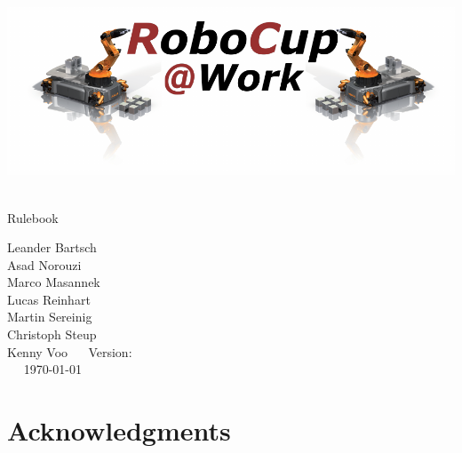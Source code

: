 
\begin{titlepage}
  \begin{center}
    {

      \includegraphics[width=\textwidth]{images/logo_RoboCupAtWork.pdf}\\[1.23ex]
    }
    \vspace{2.7 cm}
    \hrulefill\par
    {%
      \vspace*{.27cm}
      \Huge{\RCAW}\\[1.23ex]
      \Large Rulebook \\[2ex]
    }

    \hrulefill\par

    \vfill
    Leander Bartsch\\
    Asad Norouzi\\
    Marco Masannek\\
    Lucas Reinhart\\
    Martin Sereinig\\
    Christoph Steup\\
    Kenny Voo
    \vfill
    ~~ Version: \YEAR ~~ \\
    ~~  \today ~~ \\
  \end{center}

\newpage

\section*{Acknowledgments}


\end{titlepage}
